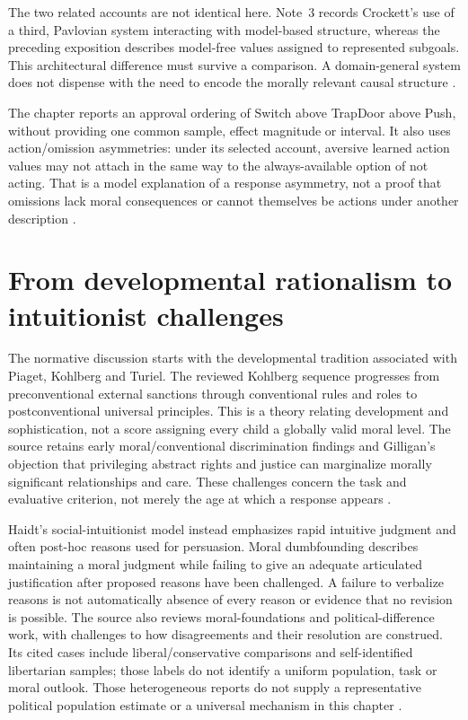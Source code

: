 The two related accounts are not identical here. Note~3 records Crockett's
use of a third, Pavlovian system interacting with model-based structure,
whereas the preceding exposition describes model-free values assigned
to represented subgoals. This architectural difference must survive a
comparison. A domain-general system does not dispense with the need
to encode the morally relevant causal structure
\parencite[pp.~703--704, note~3]{WiegmannSauer2021MoralJudgment}.

The chapter reports an approval ordering of Switch above TrapDoor above
Push, without providing one common sample, effect magnitude or interval.
It also uses action/omission asymmetries: under its selected account,
aversive learned action values may not attach in the same way to the
always-available option of not acting. That is a model explanation of
a response asymmetry, not a proof that omissions lack moral consequences
or cannot themselves be actions under another description
\parencite[pp.~703--704]{WiegmannSauer2021MoralJudgment}.

\section{From developmental rationalism to intuitionist challenges}
\label{sec:p11-r123-history}

The normative discussion starts with the developmental tradition associated
with Piaget, Kohlberg and Turiel. The reviewed Kohlberg sequence progresses
from preconventional external sanctions through conventional rules and
roles to postconventional universal principles. This is a theory relating
development and sophistication, not a score assigning every child a
globally valid moral level. The source retains early moral/conventional
discrimination findings and Gilligan's objection that privileging abstract
rights and justice can marginalize morally significant relationships and
care. These challenges concern the task and evaluative criterion, not
merely the age at which a response appears
\parencite[p.~704]{WiegmannSauer2021MoralJudgment}.

Haidt's social-intuitionist model instead emphasizes rapid intuitive
judgment and often post-hoc reasons used for persuasion. Moral
dumbfounding describes maintaining a moral judgment while failing to
give an adequate articulated justification after proposed reasons have
been challenged. A failure to verbalize reasons is not automatically
absence of every reason or evidence that no revision is possible.
The source also reviews moral-foundations and political-difference work,
with challenges to how disagreements and their resolution are construed.
Its cited cases include liberal/conservative comparisons and
self-identified libertarian samples; those labels do not identify a
uniform population, task or moral outlook.
Those heterogeneous reports do not supply a representative political
population estimate or a universal mechanism in this chapter
\parencite[pp.~704--705]{WiegmannSauer2021MoralJudgment}.

